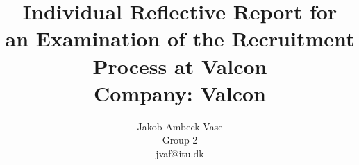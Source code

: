 \documentclass[hidelinks, a4paper]{report}
\begin{document}
\title{Individual Reflective Report for\\an Examination of the Recruitment Process at Valcon\\ \vspace{2 mm} {\large Company: Valcon}}
\author{Jakob Ambeck Vase \\ Group 2 \\ jvaf@itu.dk}

\maketitle



\end{document}
